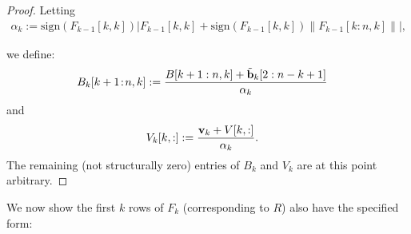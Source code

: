 \documentclass[a4paper,fleqn]{cas-sc}
\def\bfb{{\mathbf b}}
\def\bfv{{\mathbf v}}
\begin{document}
\begin{proof}
Letting
\begin{align}\label{eq:alpha_k}
\alpha_k := \text{sign}(F_{k-1}[k,k])\big| F_{k-1}[k,k] +\text{sign}(F_{k-1}[k,k])\| F_{k-1}[k\!:\!n,k]\|  \big|,
\end{align}

we define:
\begin{align}\label{eq:hv_update_1}
B_k[k+1\!:\!n,k] &:= {B[k+1:n,k] + \tilde \bfb_k[2:n-k+1] \over \alpha_k}
\end{align}
and
\begin{align}\label{eq:hv_update_2}
V_k[k,:] &:= {\bfv_k + V[k,:] \over \alpha_k}.
\end{align}
The remaining (not structurally zero) entries of $B_k$ and $V_k$ are at this point arbitrary. 
\end{proof}

We now show the first $k$ rows of $F_k$ (corresponding to $R$) also have the specified form:
\end{document}

